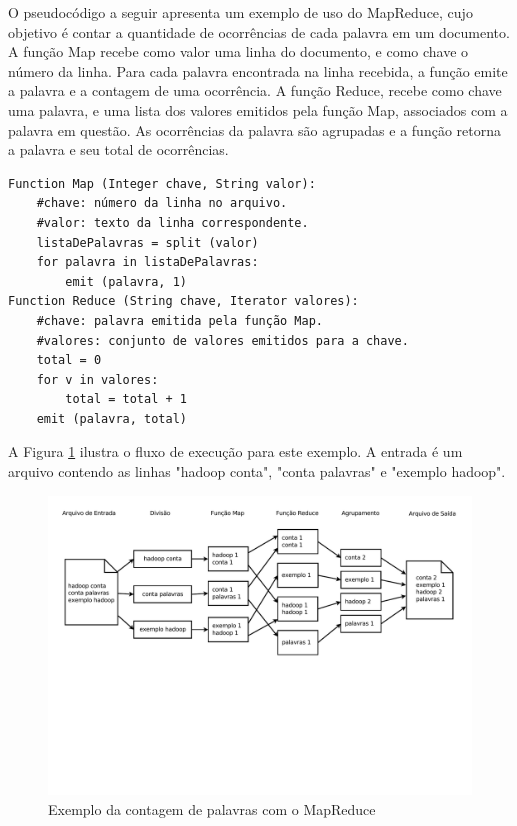 O pseudocódigo a seguir apresenta um exemplo de uso do MapReduce, cujo objetivo é contar a quantidade de ocorrências de cada palavra em um documento. A função Map recebe como valor uma linha do documento, e como chave o número da linha. Para cada palavra encontrada na linha recebida, a função emite a palavra e a contagem de uma ocorrência. A função Reduce, recebe como chave uma palavra, e uma lista dos valores emitidos pela função Map, associados com a palavra em questão. As ocorrências da palavra são agrupadas e a função retorna a palavra e seu total de ocorrências.

\begin{lstlisting}[label=some-code,caption=Pseudocódigo para contagem de palavras no modelo MapReduce]
Function Map (Integer chave, String valor):
	#chave: número da linha no arquivo.
	#valor: texto da linha correspondente.
	listaDePalavras = split (valor)
	for palavra in listaDePalavras:
		emit (palavra, 1)
Function Reduce (String chave, Iterator valores):
	#chave: palavra emitida pela função Map.
	#valores: conjunto de valores emitidos para a chave.
	total = 0
	for v in valores:
		total = total + 1
	emit (palavra, total)
\end{lstlisting}

A Figura \ref{fig:MapReduceexemplo} ilustra o fluxo de execução para este exemplo. A entrada é um arquivo contendo as linhas "hadoop conta", "conta palavras" e "exemplo hadoop".

\begin{figure}[htb]
\centering
\includegraphics[trim=0cm 9cm 0cm 1cm, width=\textwidth]{figuras/MapReduceExemplo.pdf}
\caption{Exemplo da contagem de palavras com o MapReduce}
\label{fig:MapReduceexemplo}
\end{figure}

